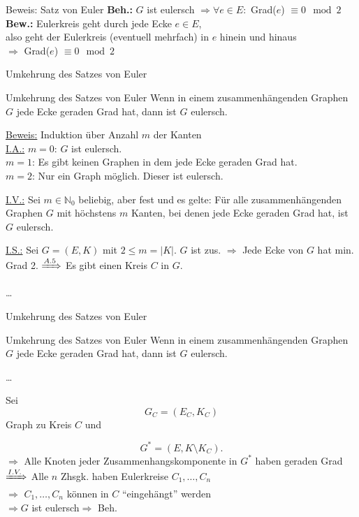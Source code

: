 \begin{frame}{Beweis: Satz von Euler}
\textbf{Beh.:} $G$ ist eulersch $\Rightarrow \forall e \in E: $ Grad($e$) $\equiv 0 \mod 2$ \pause \\
\textbf{Bew.:} Eulerkreis geht durch jede Ecke $e \in E$\pause,  \\
also geht der Eulerkreis (eventuell mehrfach) in $e$ hinein und hinaus \pause \\
$\Rightarrow$ Grad($e$) $\equiv 0 \mod 2$
\end{frame}

\begin{frame}{Umkehrung des Satzes von Euler}
\begin{block}{Umkehrung des Satzes von Euler}
Wenn in einem zusammenhängenden Graphen $G$ jede Ecke geraden Grad hat, dann
ist $G$ eulersch.
\end{block}
\pause
\underline{Beweis:} Induktion über Anzahl $m$ der Kanten\\
\pause
\underline{I.A.:} $m=0$: $G$ ist eulersch. \cmark\\
\pause
$m=1$: Es gibt keinen Graphen in dem jede Ecke geraden Grad hat. \cmark\\
\pause
$m=2$: Nur ein Graph möglich. Dieser ist eulersch. \cmark\\
\pause

\underline{I.V.:} Sei $m \in \mathbb{N}_0$ beliebig, aber fest und
es gelte: Für
alle zusammenhängenden Graphen $G$ mit höchstens $m$ Kanten, bei
denen jede Ecke geraden Grad hat, ist $G$ eulersch.

\pause

\underline{I.S.:} Sei $G=(E,K)$ mit $2 \leq m  = |K|$. $G$ ist zus. \pause
$\Rightarrow$ Jede Ecke von $G$ hat min. Grad 2. \pause
$\xRightarrow[]{A. 5}$ Es gibt einen Kreis $C$ in $G$.\pause

\dots

\end{frame}

\begin{frame}{Umkehrung des Satzes von Euler}
\begin{block}{Umkehrung des Satzes von Euler}
Wenn in einem zusammenhängenden Graphen $G$ jede Ecke geraden Grad hat, dann
ist $G$ eulersch.
\end{block}
\dots

Sei
\[G_C = (E_C, K_C) \]
Graph zu Kreis $C$ und

\[G^* = (E, K \setminus K_C).\] \pause
$\Rightarrow$ Alle Knoten jeder Zusammenhangskomponente in $G^*$ haben geraden Grad\\
\pause
$\xRightarrow[]{I.V.}$ Alle $n$ Zhsgk. haben Eulerkreise $C_1, \dots, C_n$\\
\pause
$\Rightarrow$ $C_1, \dots, C_n$ können in $C$ \enquote{eingehängt} werden\\
\pause
$\Rightarrow G$ ist eulersch\pause $\Rightarrow $ Beh.
\end{frame}

